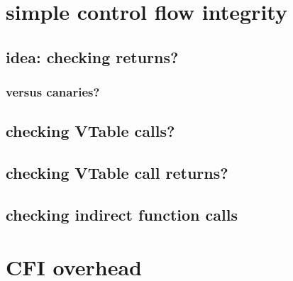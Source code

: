 \graphicspath{{./figures/}}
\title{}
\usepackage[outputdir=latex.out]{minted}
\date{}

\begin{frame}
    \titlepage
\end{frame}


\section{simple control flow integrity}

\subsection{idea: checking returns?}



        

\subsubsection{versus canaries?}


\subsection{checking VTable calls?}


\subsection{checking VTable call returns?}


\subsection{checking indirect function calls}



\section{CFI overhead}


